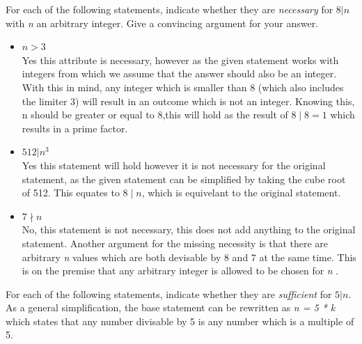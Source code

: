 \documentclass[a4paper]{article}
\begin{document}
For each of the following statements, indicate whether they are \textit{necessary} for $8 | n$ with \textit{n} an arbitrary integer. Give a convincing argument for your answer.
\begin{itemize}
    \item $ n > 3  $ \\
    Yes this attribute is necessary, however as the given statement works with integers from which we assume that the answer should also be an integer.
    With this in mind, any integer which is smaller than 8 (which also includes the limiter 3) will result in an outcome which is not an integer.
    Knowing this, n should be greater or equal to 8,this will hold as the result of $8 \mid 8 = 1$ which results in a prime factor.
    \item $ 512 | n^3 $ \\
    Yes this statement will hold however it is not necessary for the original statement, as the given statement can be simplified by taking the cube root of 512.
    This equates to $8 \mid n $, which is equivelant to the original statement.
    \item $ 7 \nmid n $ \\
    No, this statement is not necessary, this does not add anything to the original statement.
    Another argument for the missing necessity is that there are arbitrary \textit{n} values which are both devisable by 8 and 7 at the same time.
    This is on the premise that any arbitrary integer is allowed to be chosen for \textit{n} .
\end{itemize} 

For each of the following statements, indicate whether they are \textit{sufficient} for $5 | n$.
As a general simplification, the base statement can be rewritten as \textit{n = 5 * k} which states that any number divisable by 5 is any number which is a multiple of 5.
\end{document}
